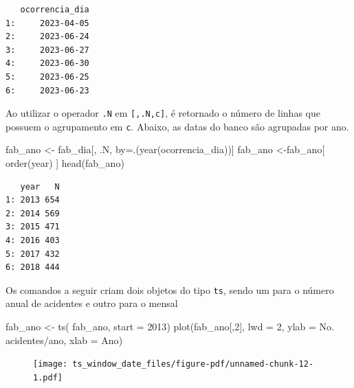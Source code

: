 \documentclass[
  letterpaper,
  DIV=11,
  numbers=noendperiod]{scrreprt}
\newenvironment{Shaded}{\begin{snugshade}}{\end{snugshade}}
\newcommand{\AttributeTok}[1]{\textcolor[rgb]{0.40,0.45,0.13}{#1}}
\newcommand{\DecValTok}[1]{\textcolor[rgb]{0.68,0.00,0.00}{#1}}
\newcommand{\FunctionTok}[1]{\textcolor[rgb]{0.28,0.35,0.67}{#1}}
\newcommand{\NormalTok}[1]{\textcolor[rgb]{0.00,0.23,0.31}{#1}}
\newcommand{\OtherTok}[1]{\textcolor[rgb]{0.00,0.23,0.31}{#1}}
\newcommand{\StringTok}[1]{\textcolor[rgb]{0.13,0.47,0.30}{#1}}
\theoremstyle{definition}
\theoremstyle{plain}
\theoremstyle{definition}
\theoremstyle{plain}
\theoremstyle{remark}
\begin{document}
\begin{verbatim}
   ocorrencia_dia
1:     2023-04-05
2:     2023-06-24
3:     2023-06-27
4:     2023-06-30
5:     2023-06-25
6:     2023-06-23
\end{verbatim}

Ao utilizar o operador \texttt{.N} em \texttt{{[},.N,c{]}}, é retornado
o número de linhas que possuem o agrupamento em \texttt{c}. Abaixo, as
datas do banco são agrupadas por ano.

\begin{Shaded}
\begin{Highlighting}[]
\NormalTok{fab\_ano }\OtherTok{\textless{}{-}}\NormalTok{ fab\_dia[, .N, by}\OtherTok{=}\NormalTok{.(}\FunctionTok{year}\NormalTok{(ocorrencia\_dia))]}
\NormalTok{fab\_ano }\OtherTok{\textless{}{-}}\NormalTok{fab\_ano[ }\FunctionTok{order}\NormalTok{(year) ]}
\FunctionTok{head}\NormalTok{(fab\_ano)}
\end{Highlighting}
\end{Shaded}

\begin{verbatim}
   year   N
1: 2013 654
2: 2014 569
3: 2015 471
4: 2016 403
5: 2017 432
6: 2018 444
\end{verbatim}

Os comandos a seguir criam dois objetos do tipo \texttt{ts}, sendo um
para o número anual de acidentes e outro para o mensal

\begin{Shaded}
\begin{Highlighting}[]
\NormalTok{fab\_ano }\OtherTok{\textless{}{-}} \FunctionTok{ts}\NormalTok{( fab\_ano, }\AttributeTok{start =} \DecValTok{2013}\NormalTok{)}
\FunctionTok{plot}\NormalTok{(fab\_ano[,}\DecValTok{2}\NormalTok{], }\AttributeTok{lwd =} \DecValTok{2}\NormalTok{, }\AttributeTok{ylab =} \StringTok{\textquotesingle{}No. acidentes/ano\textquotesingle{}}\NormalTok{, }\AttributeTok{xlab =} \StringTok{\textquotesingle{}Ano\textquotesingle{}}\NormalTok{)}
\end{Highlighting}
\end{Shaded}

\begin{figure}[H]

{\centering \texttt{[image: ts\_window\_date\_files/figure-pdf/unnamed-chunk-12-1.pdf]}

}

\end{figure}
\end{document}
